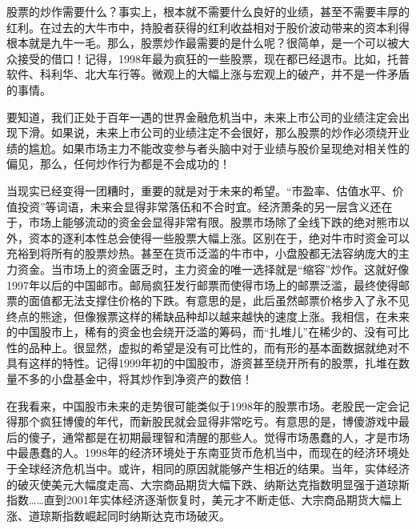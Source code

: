 股票的炒作需要什么？事实上，根本就不需要什么良好的业绩，甚至不需要丰厚的红利。在过去的大牛市中，持股者获得的红利收益相对于股价波动带来的资本利得根本就是九牛一毛。那么，股票炒作最需要的是什么呢？很简单，是一个可以被大众接受的借口！记得，1998年最为疯狂的一些股票，现在都已经退市。比如，托普软件、科利华、北大车行等。微观上的大幅上涨与宏观上的破产，并不是一件矛盾的事情。

要知道，我们正处于百年一遇的世界金融危机当中，未来上市公司的业绩注定会出现下滑。如果说，未来上市公司的业绩注定不会很好，那么股票的炒作必须绕开业绩的尴尬。如果市场主力不能改变参与者头脑中对于业绩与股价呈现绝对相关性的偏见，那么，任何炒作行为都是不会成功的！

当现实已经变得一团糟时，重要的就是对于未来的希望。“市盈率、估值水平、价值投资”等词语，未来会显得非常落伍和不合时宜。经济萧条的另一层含义还在于，市场上能够流动的资金会显得非常有限。股票市场除了全线下跌的绝对熊市以外，资本的逐利本性总会使得一些股票大幅上涨。区别在于，绝对牛市时资金可以充裕到将所有的股票炒热。甚至在货币泛滥的牛市中，小盘股都无法容纳庞大的主力资金。当市场上的资金匮乏时，主力资金的唯一选择就是“缩容”炒作。这就好像1997年以后的中国邮市。邮局疯狂发行邮票而使得市场上的邮票泛滥，最终使得邮票的面值都无法支撑住价格的下跌。有意思的是，此后虽然邮票价格步入了永不见终点的熊途，但像猴票这样的稀缺品种却以越来越快的速度上涨。我相信，在未来的中国股市上，稀有的资金也会绕开泛滥的筹码，而“扎堆儿”在稀少的、没有可比性的品种上。很显然，虚拟的希望是没有可比性的，而有形的基本面数据就绝对不具有这样的特性。记得1999年初的中国股市，游资甚至绕开所有的股票，扎堆在数量不多的小盘基金中，将其炒作到净资产的数倍！

在我看来，中国股市未来的走势很可能类似于1998年的股票市场。老股民一定会记得那个疯狂博傻的年代，而新股民就会显得非常吃亏。有意思的是，博傻游戏中最后的傻子，通常都是在初期最理智和清醒的那些人。觉得市场愚蠢的人，才是市场中最愚蠢的人。1998年的经济环境处于东南亚货币危机当中，而现在的经济环境处于全球经济危机当中。或许，相同的原因就能够产生相近的结果。当年，实体经济的破灭使美元大幅度走高、大宗商品期货大幅下跌、纳斯达克指数明显强于道琼斯指数……直到2001年实体经济逐渐恢复时，美元才不断走低、大宗商品期货大幅上涨、道琼斯指数崛起同时纳斯达克市场破灭。

